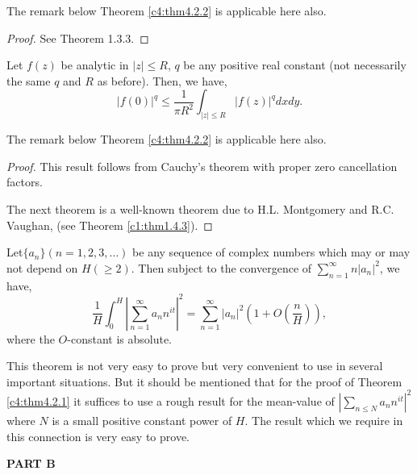\begin{remark*}
The remark below Theorem \ref{c4:thm4.2.2} is applicable here also. 
\end{remark*}

\begin{proof}
See Theorem 1.3.3.
\end{proof}

\begin{theorem}\label{c4:thm4.2.4}
Let $f(z)$ be analytic in $|z| \leq R$, $q$ be any positive real constant (not necessarily the same $q$ and $R$ as before). Then, we have,
$$
|f(0)|^q \leq \frac{1}{\pi R^2} \int_{|z| \leq R} |f(z)|^q dx dy.
$$
\end{theorem}

\begin{remark*}
The remark below Theorem \ref{c4:thm4.2.2} is applicable here also.
\end{remark*}

\begin{proof}
This result follows from Cauchy's theorem with proper zero cancellation factors.

The next theorem is a well-known theorem due to H.L. Montgomery and R.C. Vaughan, (see Theorem \ref{c1:thm1.4.3}).
\end{proof}

\begin{theorem}\label{c4:thm4.2.5}
Let\pageoriginale $\{a_n\} (n=1,2,3,\ldots)$ be any sequence of complex numbers which may or may not depend on $H (\geq 2)$. Then subject to the convergence of $\sum\limits^\infty_{n=1} n |a_n|^2$, we have,
$$
\frac{1}{H} \int^H_0 |\sum\limits^\infty_{n=1} a_n n^{it}|^2 = \sum\limits^\infty_{n=1} |a_n|^2 \left(1+O \left( \frac{n}{H}\right) \right),
$$
where the $O$-constant is absolute.
\end{theorem}

\begin{remark*}
This theorem is not very easy to prove but very convenient to use in several important situations. But it should be mentioned that for the proof of Theorem \ref{c4:thm4.2.1} it suffices to use a rough result for the mean-value of $|\sum\limits_{n\leq N} a_n n^{it}|^2$ where $N$ is a small positive constant power of $H$. The result which we require in this connection is very easy to prove.
\end{remark*}

\begin{center}
\textbf{PART B}
\end{center}

